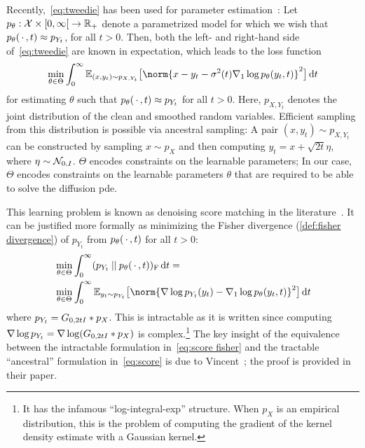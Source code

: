 Recently,~\eqref{eq:tweedie} has been used for parameter estimation~\cite{song_scorebased_2021,vincent_connection_2011}:
Let \( p_\theta : \mathcal{X} \times \rinterval{\num{0}}{\infty} \to \R_+ \) denote a parametrized model for which we wish that \( p_\theta(\,\cdot\,, t) \approx p_{Y_t} \), for all \( t > \num{0} \).
Then, both the left- and right-hand side of~\eqref{eq:tweedie} are known in expectation, which leads to the loss function
\begin{equation}
\min_{\theta \in \Theta} \int_{\num{0}}^{\infty} \mathbb{E}_{(x, y_t) \sim p_{X, Y_t}} \bigl[ \norm{x - y_t - \sigma^{\num{2}}(t) \Grad_{1} \log p_\theta(y_t, t)}^{\num{2}} \bigr] \,\mathrm{d}t 
	\label{eq:score}
\end{equation}
for estimating \( \theta \) such that \( p_\theta(\,\cdot\,, t) \approx p_{Y_t} \) for all \( t > \num{0} \).
Here, \( p_{X, Y_t} \) denotes the joint distribution of the clean and smoothed random variables.
Efficient sampling from this distribution is possible via ancestral sampling:
A pair \( (x, y_t) \sim p_{X, Y_t} \) can be constructed by sampling \( x \sim p_X \) and then computing \( y_t = x + \sqrt{\num{2}t}\eta \), where \( \eta \sim \mathcal{N}_{\num{0}, I} \).
\( \Theta \) encodes constraints on the learnable parameters;
In our case, \( \Theta \) encodes constraints on the learnable parameters \( \theta \) that are required to be able to solve the diffusion \gls{pde}.

This learning problem is known as denoising score matching in the literature~\cite{song_scorebased_2021,vincent_connection_2011}.
It can be justified more formally as minimizing the Fisher divergence (\cref{def:fisher divergence}) of \( p_{Y_t} \) from \( p_\theta(\,\cdot\,, t) \) for all \( t > \num{0} \):
\begin{equation}
	\begin{aligned}
		&\min_{\theta \in \Theta} \int_{\num{0}}^{\infty} \Fisher{p_{Y_t}}{p_\theta(\argm, t)}\,\mathrm{d}t = \\
		&\min_{\theta \in \Theta} \int_{\num{0}}^{\infty} \mathbb{E}_{y_t \sim p_{Y_t}} \bigl[ \norm{\Grad \log p_{Y_t}(y_t) - \Grad_{1} \log p_\theta(y_t, t)}^{\num{2}} \bigr] \,\mathrm{d}t
	\end{aligned}
	\label{eq:score fisher}
\end{equation}
where \( p_{Y_t} = G_{\num{0}, \num{2}tI} * p_X \).
This is intractable as it is written since computing \( \nabla \log p_{Y_t} = \nabla \log (G_{\num{0},\num{2}tI} * p_X) \) is complex.\footnote{%
	It has the infamous \enquote{log-integral-exp} structure.
	When \( p_X \) is an empirical distribution, this is the problem of computing the gradient of the kernel density estimate with a Gaussian kernel.
}
The key insight of the equivalence between the intractable formulation in~\cref{eq:score fisher} and the tractable \enquote{ancestral} formulation in~\cref{eq:score} is due to Vincent~\cite{vincent_connection_2011};
the proof is provided in their paper.
